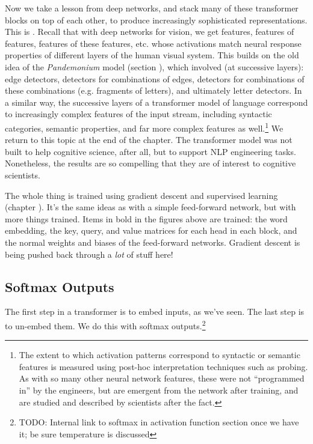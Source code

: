 Now we take a lesson from deep networks, and stack many of these transformer blocks on top of each other, to produce increasingly sophisticated representations. This is . Recall that with deep networks for vision, we get features, features of features, features of these features, etc. whose activations match neural response properties of different layers of the human visual system. This builds on the old idea of the \emph{Pandemonium} model (section ), which involved (at successive layers): edge detectors, detectors for combinations of edges, detectors for combinations of these combinations (e.g. fragments of letters), and ultimately letter detectors. In a similar way, the successive layers of a transformer model of language correspond to increasingly complex features of the input stream, including syntactic categories, semantic properties, and far more complex features as well.\footnote{The extent to which activation patterns correspond to syntactic or semantic features is measured using post-hoc interpretation techniques such as probing. As with so many other neural network features, these were not ``programmed in'' by the engineers, but are emergent from the network after training, and are studied and described by scientists after the fact.}  We return to this topic at the end of the chapter. The transformer model was not built to help cognitive science, after all, but to support NLP engineering tasks. Nonetheless, the results are so compelling that they are of interest to cognitive scientists.

The whole thing is trained using gradient descent and supervised learning (chapter ). It's the same ideas as with a simple feed-forward network, but with more things trained. Items in bold in the figures above are trained: the word embedding, the key, query, and value matrices for each head  in each block, and the normal weights and biases of the feed-forward networks.  Gradient descent is being pushed back through a \emph{lot} of stuff here!

\subsection{Softmax Outputs}\label{llmOutput}

The first step in a transformer is to embed inputs, as we've seen. The last step is to un-embed them. We do this with softmax outputs.\footnote{TODO: Internal link to softmax in activation function section once we have it; be sure temperature is discussed}

